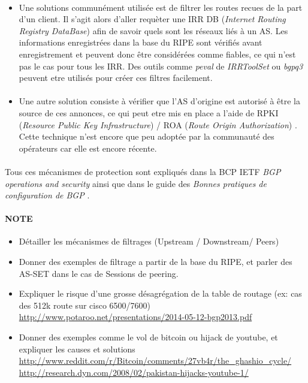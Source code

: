 \paragraph{}
\begin{itemize}
\item Une solutions communément utilisée est de filtrer les routes recues de la part d'un client. Il s'agit alors d'aller requèter une IRR DB (\emph{Internet Routing Registry DataBase}) afin de savoir quels sont les réseaux liés à un AS. Les informations enregistrées dans la base du RIPE sont vérifiés avant enregistrement et peuvent donc être considérées comme fiables, ce qui n'est pas le cas pour tous les IRR. Des outils comme \emph{peval} de \emph{IRRToolSet}\cite{fenioux:IRRTOOLSET} ou \emph{bgpq3}\cite{fenioux:BGPQ3} peuvent etre utilisés pour créer ces filtres facilement.

\paragraph{}
\item Une autre solution consiste à vérifier que l'AS d'origine est autorisé à être la source de ces annonces, ce qui peut etre mis en place a l'aide de RPKI (\emph{Resource Public Key Infrastructure}) / ROA (\emph{Route Origin Authorization}) \cite{fenioux:RPKIROA}. Cette technique n'est encore que peu adoptée par la communauté des opérateurs car elle est encore récente.
\end{itemize}

\paragraph{}
Tous ces mécanismes de protection sont expliqués dans la BCP IETF \emph{BGP operations and security} \cite{fenioux:BGPOPSEC} ainsi que dans le guide des \emph{Bonnes pratiques de configuration de BGP} \cite{fenioux:ANSSIBGP}.

\paragraph{}
\paragraph{NOTE}
\begin{itemize}
\item Détailler les mécanismes de filtrages (Upstream / Downstream/ Peers)
\item Donner des exemples de filtrage a partir de la base du RIPE, et parler des AS-SET dans le cas de Sessions de peering.
\item Expliquer le risque d'une grosse désagrégation de la table de routage (ex: cas des 512k route sur cisco 6500/7600)
\url{http://www.potaroo.net/presentations/2014-05-12-bgp2013.pdf}
\item Donner des exemples comme le vol de bitcoin ou hijack de youtube, et expliquer les causes et solutions
\url{http://www.reddit.com/r/Bitcoin/comments/27vb4r/the_ghashio_cycle/}
\url{http://research.dyn.com/2008/02/pakistan-hijacks-youtube-1/}
\end{itemize}



